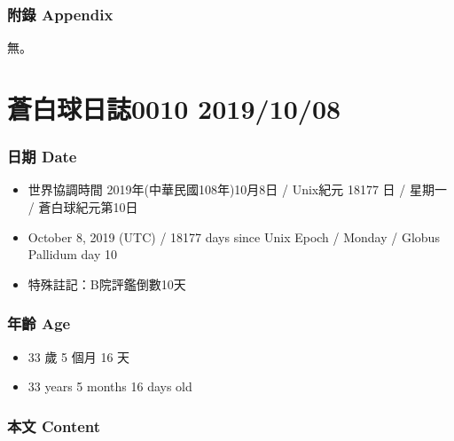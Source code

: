 \documentclass[
]{article}
\providecommand{\tightlist}{%
  \setlength{\itemsep}{0pt}\setlength{\parskip}{0pt}}
\begin{document}
\hypertarget{ux9644ux9304-appendix-2}{%
\subsubsection{附錄 Appendix}\label{ux9644ux9304-appendix-2}}

無。

\hypertarget{ux84bcux767dux7403ux65e5ux8a8c0010-20191008}{%
\section{蒼白球日誌0010
2019/10/08}\label{ux84bcux767dux7403ux65e5ux8a8c0010-20191008}}

\hypertarget{ux65e5ux671f-date-7}{%
\subsubsection{日期 Date}\label{ux65e5ux671f-date-7}}

\begin{itemize}
\tightlist
\item
  世界協調時間 2019年(中華民國108年)10月8日 / Unix紀元 18177 日 / 星期一
  / 蒼白球紀元第10日
\item
  October 8, 2019 (UTC) / 18177 days since Unix Epoch / Monday / Globus
  Pallidum day 10
\item
  特殊註記：B院評鑑倒數10天
\end{itemize}

\hypertarget{ux5e74ux9f61-age-7}{%
\subsubsection{年齡 Age}\label{ux5e74ux9f61-age-7}}

\begin{itemize}
\tightlist
\item
  33 歲 5 個月 16 天
\item
  33 years 5 months 16 days old
\end{itemize}

\hypertarget{ux672cux6587-content-7}{%
\subsubsection{本文 Content}\label{ux672cux6587-content-7}}
\end{document}
